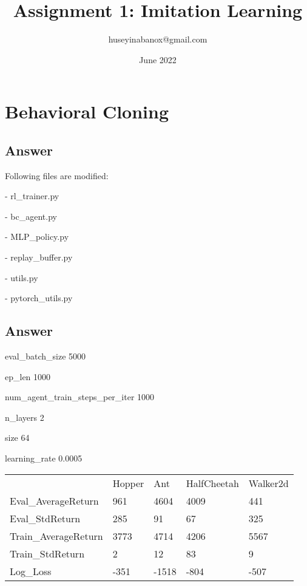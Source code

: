 \documentclass[11pt]{article}
\title{Assignment 1: Imitation Learning}
\author{huseyinabanox@gmail.com}
\date{June 2022}
\begin{document}
    \maketitle

    \section{Behavioral Cloning}

    \subsection{Answer}

    Following files are modified:

    - rl\_trainer.py

    - bc\_agent.py

    - MLP\_policy.py

    - replay\_buffer.py

    - utils.py

    - pytorch\_utils.py

    \subsection{Answer}


    \noindent eval\_batch\_size                                 5000

    \noindent ep\_len                                           1000

    \noindent num\_agent\_train\_steps\_per\_iter               1000

    \noindent n\_layers                                         2

    \noindent size                                              64

    \noindent learning\_rate                                    0.0005


    \begin{table}[]
        \begin{tabular}{lllll}
                                 & Hopper & Ant   & HalfCheetah & Walker2d \\
            Eval\_AverageReturn  & 961    & 4604  & 4009        & 441      \\
            Eval\_StdReturn      & 285    & 91    & 67          & 325      \\
            Train\_AverageReturn & 3773   & 4714  & 4206        & 5567     \\
            Train\_StdReturn     & 2      & 12    & 83          & 9        \\
            Log\_Loss            & -351   & -1518 & -804        & -507
        \end{tabular}
    \end{table}
\end{document}
